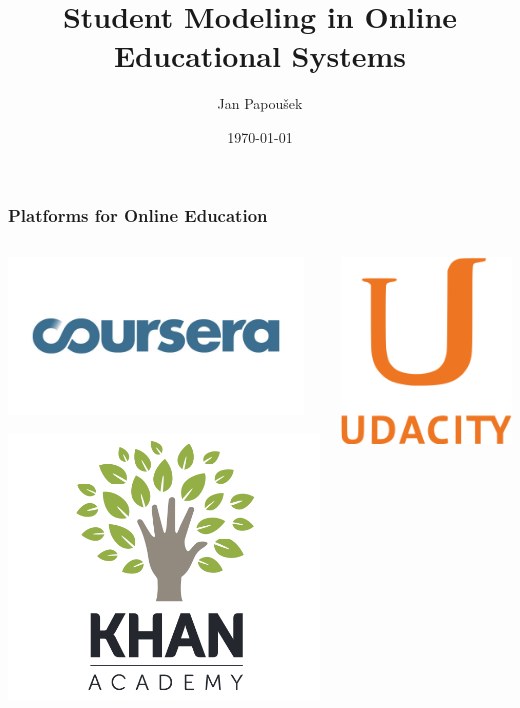\documentclass[xcolor=svgnames]{beamer}
\title[Student Modeling]{Student Modeling in Online Educational Systems}
\author{Jan Papoušek}
\institute{Masaryk University Brno}
\date{\today}
\begin{document}
\frame[plain]{\titlepage}
\begin{frame}
	\frametitle{Platforms for Online Education}

	\begin{columns}[2]
		\begin{center}
			\includegraphics[width=0.95\textwidth]{imgs/coursera.jpg}

			\includegraphics[width=.7\textwidth]{imgs/khanacademy.png}
		\end{center}
		\begin{center}
			\includegraphics[width=.5\textwidth]{imgs/udacity.png}


\end{center}
\end{columns}
\end{frame}
\end{document}
